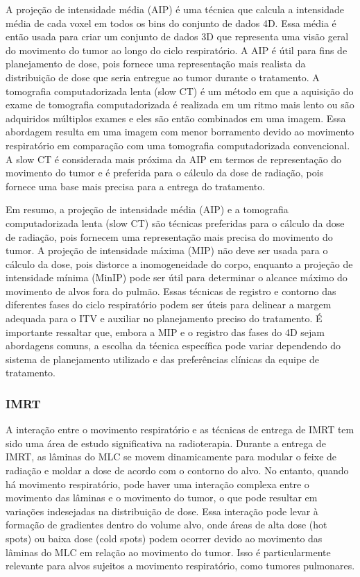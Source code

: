 \documentclass[11pt,a4paper]{article}
\begin{document}
	A projeção de intensidade média (AIP) é uma técnica que calcula a intensidade média de cada voxel em todos os bins do conjunto de dados 4D. Essa média é então usada para criar um conjunto de dados 3D que representa uma visão geral do movimento do tumor ao longo do ciclo respiratório. A AIP é útil para fins de planejamento de dose, pois fornece uma representação mais realista da distribuição de dose que seria entregue ao tumor durante o tratamento. A tomografia computadorizada lenta (slow CT) é um método em que a aquisição do exame de tomografia computadorizada é realizada em um ritmo mais lento ou são adquiridos múltiplos exames e eles são então combinados em uma imagem. Essa abordagem resulta em uma imagem com menor borramento devido ao movimento respiratório em comparação com uma tomografia computadorizada convencional. A slow CT é considerada mais próxima da AIP em termos de representação do movimento do tumor e é preferida para o cálculo da dose de radiação, pois fornece uma base mais precisa para a entrega do tratamento.  

	Em resumo, a projeção de intensidade média (AIP) e a tomografia computadorizada lenta (slow CT) são técnicas preferidas para o cálculo da dose de radiação, pois fornecem uma representação mais precisa do movimento do tumor. A projeção de intensidade máxima (MIP) não deve ser usada para o cálculo da dose, pois distorce a inomogeneidade do corpo, enquanto a projeção de intensidade mínima (MinIP) pode ser útil para determinar o alcance máximo do movimento de alvos fora do pulmão. Essas técnicas de registro e contorno das diferentes fases do ciclo respiratório podem ser úteis para delinear a margem adequada para o ITV e auxiliar no planejamento preciso do tratamento. É importante ressaltar que, embora a MIP e o registro das fases do 4D sejam abordagens comuns, a escolha da técnica específica pode variar dependendo do sistema de planejamento utilizado e das preferências clínicas da equipe de tratamento. 

\subsubsection*{IMRT}

	A interação entre o movimento respiratório e as técnicas de entrega de IMRT tem sido uma área de estudo significativa na radioterapia. Durante a entrega de IMRT, as lâminas do MLC se movem dinamicamente para modular o feixe de radiação e moldar a dose de acordo com o contorno do alvo. No entanto, quando há movimento respiratório, pode haver uma interação complexa entre o movimento das lâminas e o movimento do tumor, o que pode resultar em variações indesejadas na distribuição de dose. Essa interação pode levar à formação de gradientes dentro do volume alvo, onde áreas de alta dose (hot spots) ou baixa dose (cold spots) podem ocorrer devido ao movimento das lâminas do MLC em relação ao movimento do tumor. Isso é particularmente relevante para alvos sujeitos a movimento respiratório, como tumores pulmonares.
\end{document}
